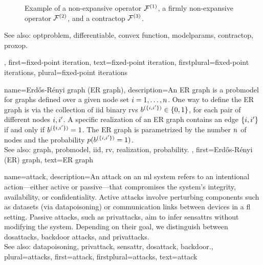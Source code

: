 {{\begin{figure}[H]
\begin{center}
			\end{center} 
			\caption{Example of a non-expansive operator $\mathcal{F}^{(1)}$, a firmly non-expansive operator $\mathcal{F}^{(2)}$, and 
				a \gls{contractop} $\mathcal{F}^{(3)}$. \label{fig_examples_nonexp_dict}}
		\end{figure} 
		See also: \gls{optproblem}, \gls{differentiable}, \gls{convex} \gls{function}, \gls{modelparams}, \gls{contractop}, \gls{proxop}.
	},
	first={fixed-point iteration},
	text={fixed-point iteration},
	firstplural={fixed-point iterations}, 
	plural={fixed-point iterations}
}


{name={Erd\H{o}s-R\'enyi graph (ER graph)},
	description={An ER  \gls{graph} is a \gls{probmodel} for \glspl{graph} defined over 
		a given node set $i=1,\ldots,n$. One way to define the ER \gls{graph} is 
		via the collection of \gls{iid} binary \glspl{rv} $b^{(\{i,i'\})} \in \{0,1\}$, 
		for each pair of different nodes $i, i'$. A specific \gls{realization}  
		of an ER \gls{graph} contains an edge $\{i,i'\}$ if and only if 
		$b^{(\{i,i'\})}=1$. The ER \gls{graph} is parametrized by the 
		number $n$ of nodes and the \gls{probability} $p({b^{(\{i,i'\})}=1})$. 
		\\
		See also: \gls{graph}, \gls{probmodel}, \gls{iid}, \gls{rv}, \gls{realization}, \gls{probability}.
	},
	first={Erd\H{o}s-R\'enyi (ER) graph},
	text={ER graph}
}

{name={attack},  
	description={An attack on an \gls{ml} system refers to an intentional action—either 
		active or passive—that compromises the system's integrity, availability, or confidentiality. 
		Active attacks involve perturbing components such as \glspl{dataset} (via \gls{datapoisoning}) 
		or communication links between \glspl{device} in a \gls{fl} setting. Passive attacks, 
		such as \glspl{privattack}, aim to infer \glspl{sensattr} without modifying the system. 
		Depending on their goal, we distinguish between \glspl{dosattack}, \gls{backdoor} attacks, and \glspl{privattack}.
		\\
		See also:  \gls{datapoisoning}, \gls{privattack}, \gls{sensattr}, \gls{dosattack}, \gls{backdoor}.},
	plural={attacks}, 
	first={attack},
	firstplural={attacks},
	text={attack}
}

